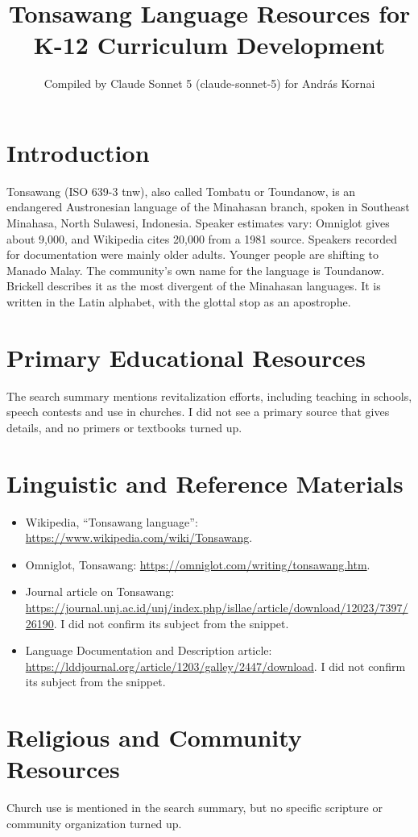\documentclass[12pt]{article}
\title{Tonsawang Language Resources for K-12 Curriculum Development}
\author{Compiled by Claude Sonnet 5 (claude-sonnet-5) for Andr\'as Kornai}
\date{}
\begin{document}
\maketitle

\section{Introduction}
Tonsawang (ISO 639-3 tnw), also called Tombatu or Toundanow, is an endangered Austronesian language of the Minahasan branch, spoken in Southeast Minahasa, North Sulawesi, Indonesia. Speaker estimates vary: Omniglot gives about 9,000, and Wikipedia cites 20,000 from a 1981 source. Speakers recorded for documentation were mainly older adults. Younger people are shifting to Manado Malay. The community's own name for the language is Toundanow. Brickell describes it as the most divergent of the Minahasan languages. It is written in the Latin alphabet, with the glottal stop as an apostrophe.

\section{Primary Educational Resources}
The search summary mentions revitalization efforts, including teaching in schools, speech contests and use in churches. I did not see a primary source that gives details, and no primers or textbooks turned up.

\section{Linguistic and Reference Materials}
\begin{itemize}
\item Wikipedia, ``Tonsawang language'': \url{https://www.wikipedia.com/wiki/Tonsawang}.
\item Omniglot, Tonsawang: \url{https://omniglot.com/writing/tonsawang.htm}.
\item Journal article on Tonsawang: \url{https://journal.unj.ac.id/unj/index.php/isllae/article/download/12023/7397/26190}. I did not confirm its subject from the snippet.
\item Language Documentation and Description article: \url{https://lddjournal.org/article/1203/galley/2447/download}. I did not confirm its subject from the snippet.
\end{itemize}

\section{Religious and Community Resources}
Church use is mentioned in the search summary, but no specific scripture or community organization turned up.
\end{document}

